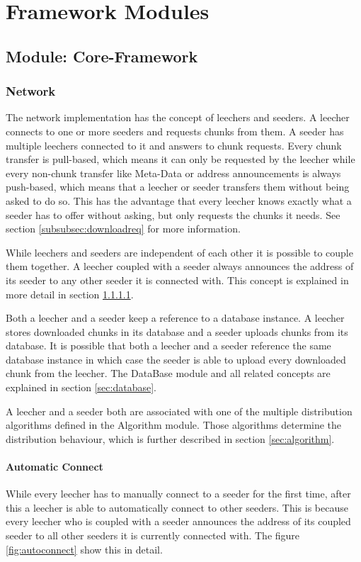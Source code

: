 \chapter{Framework Modules}
\label{ch:framework}

\section{Module: Core-Framework}
\label{sec:core}
\subsection{Network}
The network implementation has the concept of leechers and seeders. A leecher connects to one or more seeders and requests chunks from them. A seeder has multiple leechers connected to it and answers to chunk requests. Every chunk transfer is pull-based, which means it can only be requested by the leecher while every non-chunk transfer like Meta-Data or address announcements is always push-based, which means that a leecher or seeder transfers them without being asked to do so. This has the advantage that every leecher knows exactly what a seeder has to offer without asking, but only requests the chunks it needs. See section \ref{subsubsec:downloadreq} for more information.

While leechers and seeders are independent of each other it is possible to couple them together. A leecher coupled with a seeder always announces the address of its seeder to any other seeder it is connected with. This concept is explained in more detail in section \ref{subsubsec:autoconnect}.

Both a leecher and a seeder keep a reference to a database instance. A leecher stores downloaded chunks in its database and a seeder uploads chunks from its database. It is possible that both a leecher and a seeder reference the same database instance in which case the seeder is able to upload every downloaded chunk from the leecher. The DataBase module and all related concepts are explained in section \ref{sec:database}.

A leecher and a seeder both are associated with one of the multiple distribution algorithms defined in the Algorithm module. Those algorithms determine the distribution behaviour, which is further described in section \ref{sec:algorithm}.

\subsubsection{Automatic Connect}
\label{subsubsec:autoconnect}
While every leecher has to manually connect to a seeder for the first time, after this a leecher is able to automatically connect to other seeders. This is because every leecher who is coupled with a seeder announces the address of its coupled seeder to all other seeders it is currently connected with. The figure \ref{fig:autoconnect} show this in detail.

